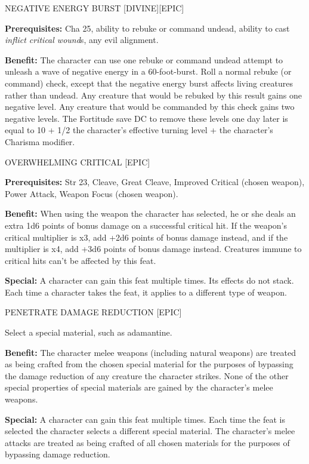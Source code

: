 \documentclass{article}
\begin{document}
\vspace{12pt}
NEGATIVE ENERGY BURST [DIVINE][EPIC] 

\textbf{Prerequisites:} Cha 25, ability to rebuke or command undead, ability to 
cast \textit{inflict critical wound}s, any evil alignment. 

\textbf{Benefit:} The character can use one rebuke or command undead attempt to 
unleash a wave of negative energy in a 60-foot-burst. Roll a normal rebuke (or 
command) check, except that the negative energy burst affects living creatures 
rather than undead. Any creature that would be rebuked by this result gains one 
negative level. Any creature that would be commanded by this check gains two negative 
levels. The Fortitude save DC to remove these levels one day later is equal to 
10 + 1/2 the character's effective turning level + the character's Charisma modifier. 

\vspace{12pt}
OVERWHELMING CRITICAL [EPIC] 

\textbf{Prerequisites:} Str 23, Cleave, Great Cleave, Improved Critical (chosen 
weapon), Power Attack, Weapon Focus (chosen weapon). 

\textbf{Benefit:} When using the weapon the character has selected, he or she deals 
an extra 1d6 points of bonus damage on a successful critical hit. If the weapon's 
critical multiplier is x3, add +2d6 points of bonus damage instead, and if the 
multiplier is x4, add +3d6 points of bonus damage instead. Creatures immune to 
critical hits can't be affected by this feat.

\textbf{Special:} A character can gain this feat multiple times. Its effects do 
not stack. Each time a character takes the feat, it applies to a different type 
of weapon. 

\vspace{12pt}
PENETRATE DAMAGE REDUCTION [EPIC] 

Select a special material, such as adamantine. 

\textbf{Benefit: }The character melee weapons (including natural weapons) are treated 
as being crafted from the chosen special material for the purposes of bypassing 
the damage reduction of any creature the character strikes. None of the other special 
properties of special materials are gained by the character's melee weapons.

\textbf{Special:} A character can gain this feat multiple times.  Each time the 
feat is selected the character selects a different special material.  The character's 
melee attacks are treated as being crafted of all chosen materials for the purposes 
of bypassing damage reduction.
\end{document}
